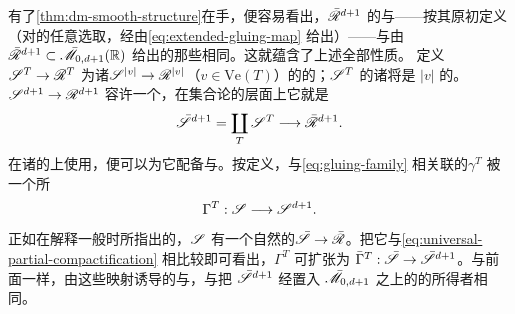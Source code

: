 有了\cref{thm:dm-smooth-structure}在手，便容易看出，$\bar{\mathscr{R}}^{d+1}$ 的\trTopology{}与\trSmoothStructure——按其原初定义（对\trStriplikeEnd{}的任意\trUniversal{}选取，经由\trGluingMap{}\eqref{eq:extended-gluing-map} 给出）——与由\trEmbedding{}$\bar{\mathscr{R}}^{d+1}\subset\bar{\mathscr{M}}_{0,d+1}(\mathbb{R})$ 给出的那些相同。这就蕴含了上述全部性质。
定义 $\mathscr{S}^T\to\mathscr{R}^T$ 为诸\trUniversal{}\trFibration{}$\mathscr{S}^{|v|}\to\mathscr{R}^{|v|}$（$v\in\mathrm{Ve}(T)$）的\trPullback{}的\trDisjointUnion；$\mathscr{S}^T$ 的诸\trFiber{}将是 $|v|$ \trPointedDisc{}的\trDisjointUnion。\trUniversal\trFamily{}$\mathscr{S}^{d+1}\to\mathscr{R}^{d+1}$ 容许一个\trPartialCompactification，在集合论的层面上它就是
\begin{equation}\label{eq:universal-partial-compactification}
\bar{\mathscr{S}}^{d+1}=\coprod_T\mathscr{S}^T\longrightarrow\bar{\mathscr{R}}^{d+1}.
\end{equation}
在诸\trFamily{}的\trTotalSpace{}上使用\trGluingMap，便可以为它配备\trTopology{}与\trSmoothStructure。按定义，与\eqref{eq:gluing-family} 相关联的\trGluingMap{}$\gamma^T$ 被一个\trFibrewise\trIsomorphism{}所\trCovering
\begin{equation*}
\Gamma^T:\mathscr{S}\longrightarrow\mathscr{S}^{d+1}.
\end{equation*}
正如在解释一般\trGluingConstruction{}时所指出的，$\mathscr{S}$ 有一个自然的\trPartialCompactification{}$\bar{\mathscr{S}}\to\bar{\mathscr{R}}$。把它与\eqref{eq:universal-partial-compactification} 相比较即可看出，$\Gamma^T$ 可扩张为 $\bar\Gamma^T:\bar{\mathscr{S}}\to\bar{\mathscr{S}}^{d+1}$。与前面一样，由这些映射诱导的\trTopology{}与\trSmoothStructure，与把 $\bar{\mathscr{S}}^{d+1}$ 经\trEmbedding{}置入 $\bar{\mathscr{M}}_{0,d+1}$ 之上的\trStableCurve{}的\trUniversal\trFamily{}所得者相同。
